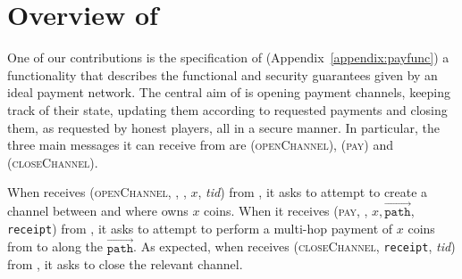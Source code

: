 \section{Overview of \fpaynet{}}
\label{sec:ov-paynet}
  One of our contributions is the specification of \fpaynet{}
  (Appendix~\ref{appendix:payfunc}) a functionality that describes the
  functional and security guarantees given by an ideal payment network. The
  central aim of \fpaynet{} is opening payment channels, keeping
  track of their state, updating them according to requested payments and
  closing them, as requested by honest players, all in a secure manner. In
  particular, the three main messages it can receive from \alice{} are
  (\textsc{openChannel}), (\textsc{pay}) and (\textsc{closeChannel}).

  When \fpaynet{} receives (\textsc{openChannel}, \alice, \bob, $x$,
  \textit{tid}) from \alice, it asks \simulator{} to attempt to create a channel
  between \alice{} and \bob{} where \alice{} owns $x$ coins. When it receives
  (\textsc{pay}, \bob, $x, \overrightarrow{\mathtt{path}}$, \texttt{receipt})
  from \alice, it asks \simulator{} to attempt to perform a multi-hop payment of
  $x$ coins from \alice{} to \bob{} along the $\overrightarrow{\mathtt{path}}$.
  As expected, when \fpaynet{} receives (\textsc{closeChannel}, \texttt{receipt},
  \textit{tid}) from \alice, it asks \simulator{} to close the relevant channel.

